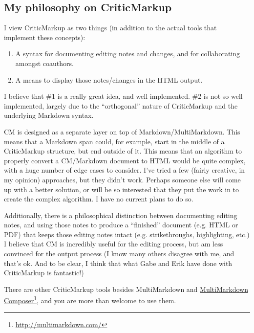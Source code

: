 \subsection{My philosophy on CriticMarkup}
\label{myphilosophyoncriticmarkup}

I view CriticMarkup as two things (in addition to the actual tools that implement these concepts):

\begin{enumerate}
\item A syntax for documenting editing notes and changes, and for collaborating amongst coauthors.

\item A means to display those notes\slash changes in the HTML output.

\end{enumerate}

I believe that \#1 is a really great idea, and well implemented. \#2 is not so well implemented, largely due to the ``orthogonal'' nature of CriticMarkup and the underlying Markdown syntax.

CM is designed as a separate layer on top of Markdown\slash MultiMarkdown. This means that a Markdown span could, for example, start in the middle of a CriticMarkup structure, but end outside of it. This means that an algorithm to properly convert a CM\slash Markdown document to HTML would be quite complex, with a huge number of edge cases to consider. I've tried a few (fairly creative, in my opinion) approaches, but they didn't work. Perhaps someone else will come up with a better solution, or will be so interested that they put the work in to create the complex algorithm. I have no current plans to do so.

Additionally, there is a philosophical distinction between documenting editing notes, and using those notes to produce a ``finished'' document (e.g. HTML or PDF) that keeps those editing notes intact (e.g. strikethroughs, highlighting, etc.) I believe that CM is incredibly useful for the editing process, but am less convinced for the output process (I know many others disagree with me, and that's ok. And to be clear, I think that what Gabe and Erik have done with CriticMarkup is fantastic!)

There are other CriticMarkup tools besides MultiMarkdown and \href{http://multimarkdown.com/}{MultiMarkdown Composer}\footnote{\href{http://multimarkdown.com/}{http:\slash \slash multimarkdown.com\slash }}, and you are more than welcome to use them.

